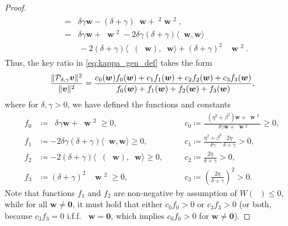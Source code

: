 \documentclass[a4paper,10pt]{article}
\DeclareMathOperator{\cL}{\widehat{\mathcal{L}}}
\DeclareMathOperator{\cLs}{\widehat{\mathcal{L}}^2}
\DeclareMathOperator{\bVert}{\big\Vert}
\begin{document}
\begin{proof}
\begin{align}
\begin{split}
&= \bVert \delta\gamma \bm{w} -(\delta+\gamma)\cL\bm{w} + \cL^2\bm{w} \bVert^2, \\
&= \bVert \delta \gamma \bm{w} + \cLs \bm{w} \bVert^2  
	- 2 \delta \gamma (\delta + \gamma ) \langle \cL \bm{w}, \bm{w} \rangle
	\\&\quad\quad	
	-2  (\delta + \gamma ) \langle \cL ( \cL \bm{w}), \cL \bm{w} \rangle 
	+  (\delta + \gamma)^2 \bVert \cL \bm{w} \bVert^2.
\end{split}
\end{align}
%
Thus, the key ratio in \eqref{eq:kappa_gen_def} takes the form
\begin{align}
\label{eq:P_gen_frac}
\frac{\Vert {\cal P}_{\delta,\gamma} \bm{v} \Vert^2}{\Vert \bm{v} \Vert^2}
=
\frac{
c_0(\bm{w}) f_0(\bm{w}) + c_1 f_1(\bm{w}) + c_2 f_2(\bm{w}) + c_3 f_3(\bm{w})
}
{
f_0(\bm{w}) + f_1(\bm{w}) + f_2(\bm{w}) + f_3(\bm{w})
},
\end{align}
where for $\delta, \gamma > 0$, we have defined the functions and constants
\begin{equation}
\begin{aligned}
\label{eq:f_c_gen_def}
f_0 &\coloneqq \bVert \delta \gamma \bm{w} + \cLs \bm{w} \bVert^2 \geq 0,
\quad
&&c_0\coloneqq \frac{\bVert (\eta^2 + \beta^2) \bm{w} + \cLs \bm{w} \bVert^2}{\bVert \delta \gamma \bm{w} + \cLs \bm{w} \bVert^2} \geq 0,
\\
f_1 &\coloneqq -2 \delta \gamma (\delta + \gamma)  \langle \cL \bm{w}, \bm{w} \rangle \geq 0,
\quad 
&&c_1\coloneqq \frac{\eta^2 + \beta^2}{\delta \gamma} \frac{2 \eta}{\delta + \gamma} > 0,\\
f_2 &\coloneqq -2( \delta + \gamma) \langle \cL( \cL \bm{w}), \cL \bm{w} \rangle \geq 0, 
\quad
&&c_2\coloneqq \frac{2 \eta}{\delta + \gamma} > 0,\\
f_3 &\coloneqq (\delta+\gamma)^2 \bVert \cL \bm{w} \bVert^2 \geq 0, 
\quad
&&c_3\coloneqq \left(\frac{2 \eta}{\delta + \gamma}\right)^2 > 0.
\end{aligned}
\end{equation}
Note that functions $f_1$ and $f_2$ are non-negative by
assumption of $W( \cL ) \leq 0$, while for all $\bm{w}\neq\mathbf{0}$, it must hold that
either $c_0f_0 > 0$ or $c_3f_3 > 0$ (or both, because $c_3f_3 = 0$ i.f.f.
$\cL\mathbf{w} = \mathbf{0}$, which implies $c_0f_0 > 0$ for $\mathbf{w}\neq\mathbf{0}$).


\end{proof}
\end{document}
